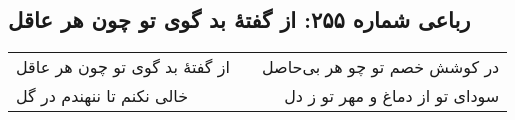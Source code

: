 \begin{center}
\section*{رباعی شماره ۲۵۵: از گفتهٔ بد گوی تو چون هر عاقل}
\label{sec:sh255}
\begin{longtable}{l p{0.5cm} r}
از گفتهٔ بد گوی تو چون هر عاقل
&&
در کوشش خصم تو چو هر بی‌حاصل
\\
خالی نکنم تا ننهندم در گل
&&
سودای تو از دماغ و مهر تو ز دل
\\
\end{longtable}
\end{center}
